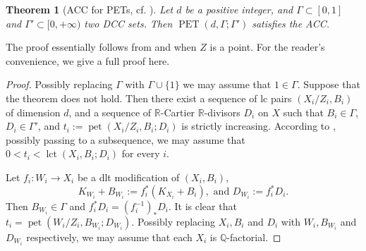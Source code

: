 \documentclass[11pt]{amsart}
\numberwithin{equation}{section}
\newcommand{\Qq}{\mathbb{Q}}
\newcommand{\Rr}{\mathbb{R}}
\newcommand{\pet}{\operatorname{pet}}
\newcommand{\PET}{\operatorname{PET}}
\newcommand{\lct}{\operatorname{lct}}
\newcommand{\Ii}{{\Gamma}}
\newtheorem{thm}{Theorem}[section]
\theoremstyle{definition}
\theoremstyle{definition}
\begin{document}
\begin{thm}[ACC for PETs, cf. {\cite[Theorem 1.6]{DC16}}]\label{thm: acc pet}
Let $d$ be a positive integer, and $\Ii\subset [0,1]$ and $\Ii'\subset [0,+\infty)$ two DCC sets. Then $\PET(d,\Ii;\Ii')$ satisfies the ACC.
\end{thm}
The proof essentially follows from \cite[proof of Theorem 1.6]{DC16} and \cite[Theorem 1.4]{HMX14} when $Z$ is a point. For the reader's convenience, we give a full proof here. 
\begin{proof}
Possibly replacing $\Ii$ with $\Ii\cup\{1\}$ we may assume that $1\in\Ii$. Suppose that the theorem does not hold. Then there exist a sequence of lc pairs $(X_i/Z_i,B_i)$ of dimension $d$, and a sequence of $\Rr$-Cartier $\Rr$-divisors $D_i$ on $X$ such that $B_i\in\Ii$, $D_i\in\Ii'$, and $t_i:=\pet(X_i/Z_i,B_i;D_i)$ is strictly increasing. According to \cite[Theorem 1.1]{HMX14}, possibly passing to a subsequence, we may assume that $0<t_i<\lct(X_i,B_i;D_i)$ for every $i$.

Let $f_i: W_i\rightarrow X_i$ be a dlt modification of $(X_i,B_i)$,
$$K_{W_i}+B_{W_i}:=f_i^*(K_{X_i}+B_i),\text{ and }D_{W_i}:=f_i^*D_i.$$
Then $B_{W_i}\in\Ii$ and $f_i^*D_i=(f_i^{-1})_*D_i$. It is clear that $t_i=\pet(W_i/Z_i,B_{W_i};D_{W_i})$. Possibly replacing $X_i,B_i$ and $D_i$ with $W_i,B_{W_i}$ and $D_{W_i}$ respectively, we may assume that each $X_i$ is $\Qq$-factorial.


\end{proof}
\end{document}
